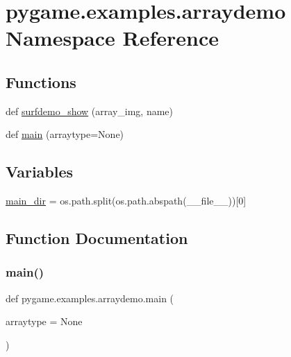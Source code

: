 \hypertarget{namespacepygame_1_1examples_1_1arraydemo}{}\section{pygame.\+examples.\+arraydemo Namespace Reference}
\label{namespacepygame_1_1examples_1_1arraydemo}
\subsection*{Functions}
\begin{DoxyCompactItemize}
\item 
def \hyperlink{namespacepygame_1_1examples_1_1arraydemo_afb5977b771166323b988670ef8e30761}{surfdemo\+\_\+show} (array\+\_\+img, name)
\item 
def \hyperlink{namespacepygame_1_1examples_1_1arraydemo_aaad4bf6aab528d71f3d153fc72723988}{main} (arraytype=None)
\end{DoxyCompactItemize}
\subsection*{Variables}
\begin{DoxyCompactItemize}
\item 
\hyperlink{namespacepygame_1_1examples_1_1arraydemo_ac7c6ac0bed98157e2c7d6ad2992a55c8}{main\+\_\+dir} = os.\+path.\+split(os.\+path.\+abspath(\+\_\+\+\_\+file\+\_\+\+\_\+))\mbox{[}0\mbox{]}
\end{DoxyCompactItemize}


\subsection{Function Documentation}
\mbox{\label{namespacepygame_1_1examples_1_1arraydemo_aaad4bf6aab528d71f3d153fc72723988}} 
\subsubsection{\texorpdfstring{main()}{main()}}
{\footnotesize\ttfamily def pygame.\+examples.\+arraydemo.\+main (\begin{DoxyParamCaption}\item[{}]{arraytype = {\ttfamily None} }\end{DoxyParamCaption})}

